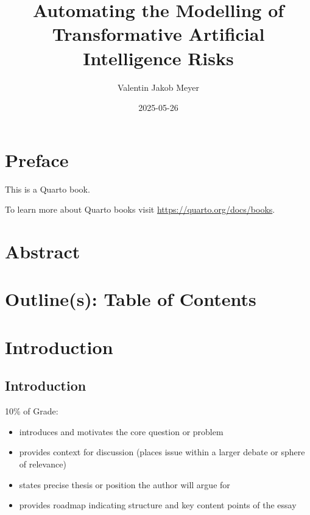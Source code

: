 \documentclass[
  letterpaper,
]{book}
\title{Automating the Modelling of Transformative Artificial
Intelligence Risks}
\author{Valentin Jakob Meyer}
\date{2025-05-26}
\providecommand{\tightlist}{%
  \setlength{\itemsep}{0pt}\setlength{\parskip}{0pt}}
\renewcommand*\contentsname{Table of contents}
\newcommand\contentsname{Table of contents}
\begin{document}
\frontmatter
\maketitle

\renewcommand*\contentsname{Table of contents}
{
\setcounter{tocdepth}{2}
\tableofcontents
}

\mainmatter
{}

\chapter*{Preface}\label{preface}


This is a Quarto book.

To learn more about Quarto books visit
\url{https://quarto.org/docs/books}.


\chapter*{Abstract}\label{sec-Abstract}



\chapter*{Outline(s): Table of Contents}\label{sec-ToC}



\chapter{Introduction}\label{introduction}

\section{Introduction}\label{introduction-1}

10\% of Grade:

\begin{itemize}
\tightlist
\item
  introduces and motivates the core question or problem
\item
  provides context for discussion (places issue within a larger debate
  or sphere of relevance)
\item
  states precise thesis or position the author will argue for
\item
  provides roadmap indicating structure and key content points of the
  essay
\end{itemize}
\end{document}
